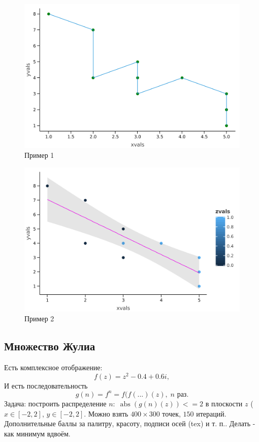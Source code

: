 \documentclass{book}
\begin{document}
\begin{figure}
    \includegraphics[width = 0.8\linewidth]{lets-plot-example-1.png}
    \caption{\label{lets-plot-example-1}Пример 1}
\end{figure}
\begin{figure}
    \includegraphics[width = 0.8\linewidth]{lets-plot-example-2.png}
    \caption{\label{lets-plot-example-2}Пример 2}
\end{figure}

\clearpage

\subsection{Множество Жулиа}

Есть комплексное отображение:
\begin{equation}
    f(z) = z^2 - 0.4 + 0.6 i,
\end{equation}
И есть последовательность
\begin{equation}
    g(n) = f^n = f(f( ...)(z), \; n \text{ раз}.
\end{equation}
Задача: построить распределение $n: \; \operatorname{abs}(g(n)(z)) <= 2$ в плоскости $z$ ($x \in [-2, 2]$, $y \in
[-2, 2]$. Можно взять $400 \times 300$ точек, $150$ итераций.  Дополнительные баллы за палитру,
красоту, подписи осей (tex) и т. п.. Делать - как минимум вдвоём.
\end{document}
